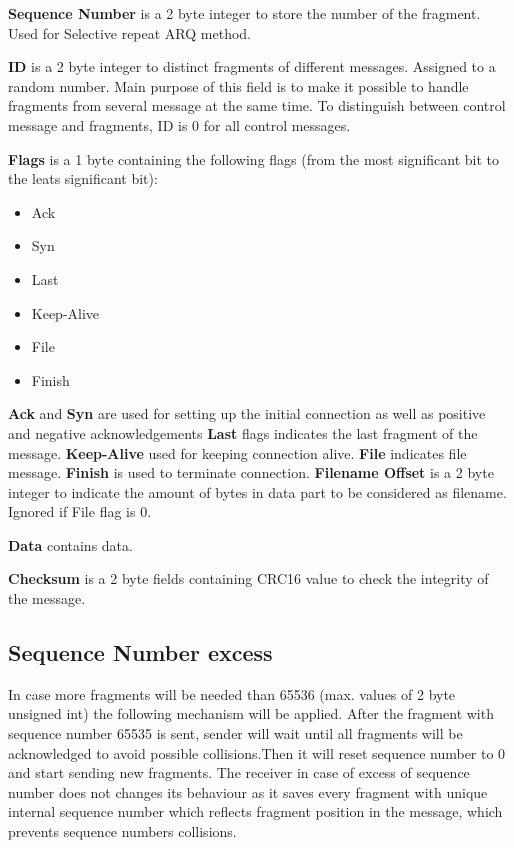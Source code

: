 \documentclass{article}
\begin{document}
\textbf{Sequence Number} is a 2 byte integer to store the number of the fragment. Used for Selective repeat ARQ method. 
\newline

\textbf{ID}  is a 2 byte integer to distinct fragments of different messages. Assigned to a random number. Main purpose of this field is to make it possible to handle fragments from several message at the same time. To distinguish between control message and fragments, ID is 0 for all control messages.
\newline

\textbf{Flags}  is a 1 byte containing the following flags (from the most significant bit to the leats significant bit):
\begin{itemize}
  \item Ack  
  \item Syn
  \item Last
  \item Keep-Alive
  \item File  
  \item Finish

 
\end{itemize}
\textbf{Ack} and \textbf{Syn} are used for setting up the initial connection as well as positive and negative acknowledgements
\newline
\textbf{Last} flags indicates the last fragment of the message.
\newline
\textbf{Keep-Alive} used for keeping connection alive.
\newline
\textbf{File} indicates file message.
\newline
\textbf{Finish} is used to terminate connection.
\newline
\textbf{Filename Offset}  is a 2 byte integer to indicate the amount of bytes in data part to be considered as filename. Ignored if File flag is 0.
\newline

\textbf{Data} contains data.
\newline

\textbf{Checksum} is a 2 byte fields containing CRC16 value to check the integrity of the message.

\subsection{Sequence Number excess}
In case more fragments will be needed than 65536 (max. values of 2 byte unsigned int) the following mechanism will be applied. After the fragment with sequence number 65535 is sent, sender will wait until all fragments will be acknowledged  to avoid possible collisions.Then it will reset sequence number to 0 and start sending new fragments. The receiver in case of excess of sequence number does not changes its behaviour as it saves every fragment with unique internal sequence number which reflects fragment position in the message, which prevents sequence numbers collisions.
\end{document}
